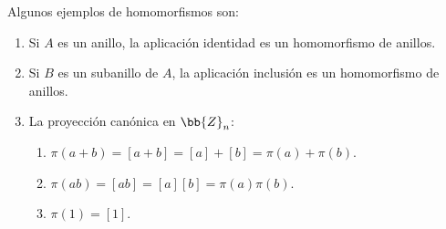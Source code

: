 \begin{ejemplo} Algunos ejemplos de homomorfismos son:
\begin{enumerate}
    \item Si $A$ es un anillo, la aplicación identidad
    es un homomorfismo de anillos.

    \item Si $B$ es un subanillo de $A$, la aplicación inclusión
    es un homomorfismo de anillos.

    \item La proyección canónica en $\bb{Z}_n$: 
    \begin{enumerate}
        \item $\pi(a+b) = [a+b] = [a]+[b] = \pi(a)+\pi(b)$.
        \item $\pi(ab) = [ab] = [a][b] = \pi(a)\pi(b)$.
        \item $\pi(1) = [1]$.
    \end{enumerate}
\end{enumerate}
\end{ejemplo}

